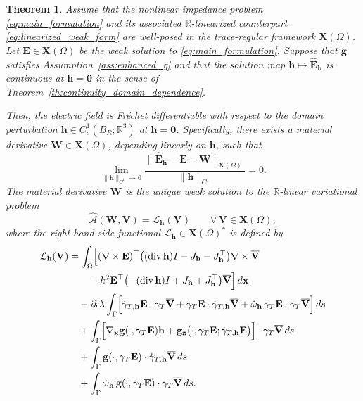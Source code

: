 \documentclass[10pt,a4paper]{amsart}
\newtheorem{theo}{Theorem}[section]
\numberwithin{equation}{section}
\begin{document}
\begin{theo}\label{th:symmetrisation1}
Assume that the nonlinear impedance problem \eqref{eq:main_formulation} and its associated $\mathbb{R}$-linearized counterpart \eqref{eq:linearized_weak_form} are well-posed in the trace-regular framework $\mathbf{X}(\Omega)$. Let $\mathbf{E} \in \mathbf{X}(\Omega)$ be the weak solution to \eqref{eq:main_formulation}. Suppose that $\mathbf{g}$ satisfies Assumption~\ref{ass:enhanced_g} and that the solution map $\mathbf{h} \mapsto \hat{\mathbf{E}}_{\mathbf{h}}$ is continuous at $\mathbf{h} = \mathbf{0}$ in the sense of Theorem~\ref{th:continuity_domain_dependence}.

Then, the electric field is Fr\'{e}chet differentiable with respect to the domain perturbation $\mathbf{h} \in C_c^1(B_R; \mathbb{R}^3)$ at $\mathbf{h} = \mathbf{0}$. Specifically, there exists a material derivative $\mathbf{W} \in \mathbf{X}(\Omega)$, depending linearly on $\mathbf{h}$, such that
\begin{equation*}
\lim_{\|\mathbf{h}\|_{C^1} \to 0} \frac{\|\hat{\mathbf{E}}_{\mathbf{h}} - \mathbf{E} - \mathbf{W}\|_{\mathbf{X}(\Omega)}}{\|\mathbf{h}\|_{C^1}} = 0.
\end{equation*}
The material derivative $\mathbf{W}$ is the unique weak solution to the $\mathbb{R}$-linear variational problem
\[
\widehat{\mathcal{A}}(\mathbf{W}, \mathbf{V}) = \mathcal{L}_{\mathbf{h}}(\mathbf{V}) \qquad \forall \, \mathbf{V} \in \mathbf{X}(\Omega),
\]
where the right-hand side functional $\mathcal{L}_{\mathbf{h}} \in \mathbf{X}(\Omega)^*$ is defined by
\begin{equation}\label{eq:material_derivative}
\begin{aligned}
\mathcal L_{\mathbf h}(\mathbf V)
&=
\int_{\Omega}
\Bigl[
(\nabla\times \mathbf E)^{\top}
\bigl(
(\operatorname{div}\mathbf h)I
-
J_{\mathbf h}
-
J_{\mathbf h}^{\top}
\bigr)
\nabla\times\overline{\mathbf V}
\\
&\qquad
-
k^2\mathbf E^{\top}
\bigl(
-(\operatorname{div}\mathbf h)I
+
J_{\mathbf h}
+
J_{\mathbf h}^{\top}
\bigr)
\overline{\mathbf V}
\Bigr]\,d\mathbf x
\\
&\quad
-ik\lambda
\int_{\Gamma}
\Bigl[\dot\gamma_{T,\mathbf h}\mathbf E\cdot\gamma_T\overline{\mathbf V}+
\gamma_T\mathbf E\cdot\dot\gamma_{T,\mathbf h}\overline{\mathbf V}+
\dot\omega_{\mathbf h}\,
\gamma_T\mathbf E\cdot\gamma_T\overline{\mathbf V}
\Bigr]\,ds\\&\quad+
\int_{\Gamma}
\Bigl[
\nabla_{\mathbf x}\mathbf g(\cdot,\gamma_T\mathbf E)\mathbf h+
\mathbf g_{\mathbf z}
\bigl(\cdot,\gamma_T\mathbf E;
\dot\gamma_{T,\mathbf h}\mathbf E\bigr)\Bigr]\cdot
\gamma_T\overline{\mathbf V}\,ds
\\
&\quad+\int_{\Gamma}
\mathbf g(\cdot,\gamma_T\mathbf E)
\cdot
\dot\gamma_{T,\mathbf h}\overline{\mathbf V}\,ds\\
&\quad+
\int_{\Gamma}\dot\omega_{\mathbf h}\,
\mathbf g(\cdot,\gamma_T\mathbf E)\cdot
\gamma_T\overline{\mathbf V}\,ds .
\end{aligned}
\end{equation}

\end{theo}
\end{document}
